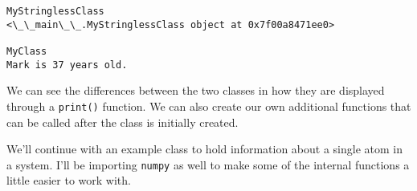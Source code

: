     \begin{Verbatim}[commandchars=\\\{\}]
MyStringlessClass
<\_\_main\_\_.MyStringlessClass object at 0x7f00a8471ee0>

MyClass
Mark is 37 years old.

    \end{Verbatim}

    We can see the differences between the two classes in how they are
displayed through a \texttt{print()} function. We can also create our
own additional functions that can be called after the class is initially
created.

We'll continue with an example class to hold information about a single
atom in a system. I'll be importing \texttt{numpy} as well to make some
of the internal functions a little easier to work with.

